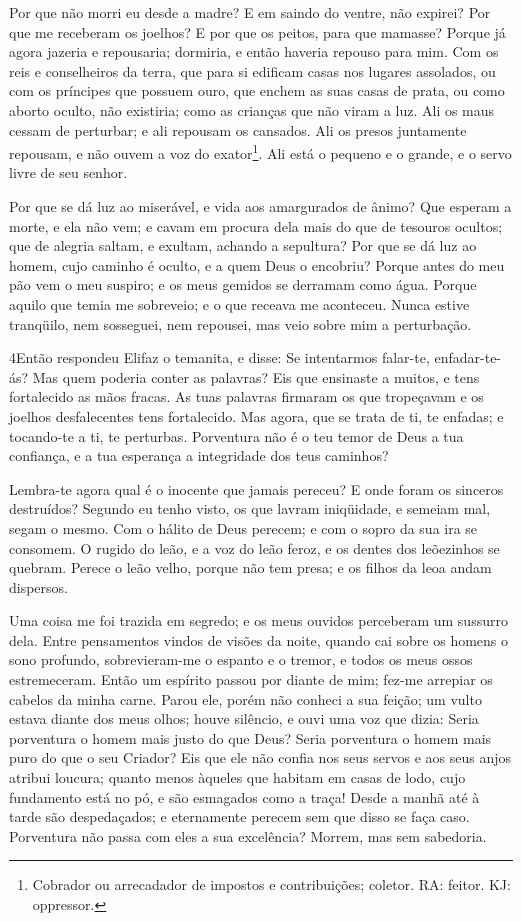 Por que não morri eu desde a madre? E em saindo do ventre, não
expirei? Por que me receberam os joelhos? E por que os
peitos, para que mamasse? Porque já agora jazeria e
repousaria; dormiria, e então haveria repouso para mim. Com
os reis e conselheiros da terra, que para si edificam casas nos
lugares assolados, ou com os príncipes que possuem ouro, que
enchem as suas casas de prata, ou como aborto oculto, não
existiria; como as crianças que não viram a luz. Ali os maus
cessam de perturbar; e ali repousam os cansados. Ali os
presos juntamente repousam, e não ouvem a voz do
exator\footnote{Cobrador ou arrecadador de impostos e contribuições;
coletor. RA: feitor. KJ: oppressor.}. Ali está o pequeno e o
grande, e o servo livre de seu senhor.

Por que se dá luz ao miserável, e vida aos amargurados de ânimo?
Que esperam a morte, e ela não vem; e cavam em procura dela
mais do que de tesouros ocultos; que de alegria saltam, e
exultam, achando a sepultura? Por que se dá luz ao homem,
cujo caminho é oculto, e a quem Deus o encobriu? Porque antes
do meu pão vem o meu suspiro; e os meus gemidos se derramam como
água. Porque aquilo que temia me sobreveio; e o que receava
me aconteceu. Nunca estive tranqüilo, nem sosseguei, nem
repousei, mas veio sobre mim a perturbação.

\medskip

\lettrine{4} Então respondeu Elifaz o temanita, e disse:
Se intentarmos falar-te, enfadar-te-ás? Mas quem poderia conter
as palavras? Eis que ensinaste a muitos, e tens fortalecido as
mãos fracas. As tuas palavras firmaram os que tropeçavam e os
joelhos desfalecentes tens fortalecido. Mas agora, que se trata
de ti, te enfadas; e tocando-te a ti, te perturbas. Porventura
não é o teu temor de Deus a tua confiança, e a tua esperança a
integridade dos teus caminhos?

Lembra-te agora qual é o inocente que jamais pereceu? E onde foram
os sinceros destruídos? Segundo eu tenho visto, os que lavram
iniqüidade, e semeiam mal, segam o mesmo. Com o hálito de Deus
perecem; e com o sopro da sua ira se consomem. O rugido do
leão, e a voz do leão feroz, e os dentes dos leõezinhos se quebram.
Perece o leão velho, porque não tem presa; e os filhos da
leoa andam dispersos.

Uma coisa me foi trazida em segredo; e os meus ouvidos perceberam
um sussurro dela. Entre pensamentos vindos de visões da
noite, quando cai sobre os homens o sono profundo,
sobrevieram-me o espanto e o tremor, e todos os meus ossos
estremeceram. Então um espírito passou por diante de mim;
fez-me arrepiar os cabelos da minha carne. Parou ele, porém
não conheci a sua feição; um vulto estava diante dos meus olhos;
houve silêncio, e ouvi uma voz que dizia: Seria porventura o
homem mais justo do que Deus? Seria porventura o homem mais puro do
que o seu Criador? Eis que ele não confia nos seus servos e
aos seus anjos atribui loucura; quanto menos àqueles que
habitam em casas de lodo, cujo fundamento está no pó, e são
esmagados como a traça! Desde a manhã até à tarde são
despedaçados; e eternamente perecem sem que disso se faça caso.
Porventura não passa com eles a sua excelência? Morrem, mas
sem sabedoria.

